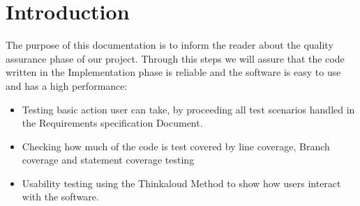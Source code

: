 \section{Introduction}
The purpose of this documentation is to inform the reader about the quality assurance phase of our project. Through this steps we will assure that the code written in the Implementation phase is reliable and the software is easy to use and has a high performance:
\begin{itemize}
    \item Testing basic action user can take, by proceeding all test scenarios handled in the Requirements specification Document. 
    \item Checking how much of the code is test covered by line coverage, Branch coverage and statement coverage testing
    \item Usability testing using the Thinkaloud Method to show how users interact with the software.
\end{itemize}